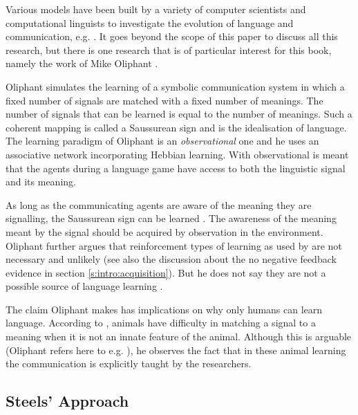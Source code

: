 

Various models have been built by a variety of computer scientists and computational linguists to investigate the evolution of language and communication, e.g. \citep{cangelosiparisi:1998,kirby:1997,maclennan:1991,oliphant:1997,wernerdyer:1991}. It goes beyond the scope of this paper to discuss all this research, but there is one research that is of particular interest for this book, namely the work of Mike Oliphant \citep{oliphant:1997,oliphant:1998,oliphant:2000}.

Oliphant simulates the learning of a symbolic communication system in which a fixed number of signals are matched with a fixed number of meanings. The number of signals that can be learned is equal to the number of meanings. Such a coherent mapping is called a Saussurean sign \citep{saussure:1974} and is the idealisation of language. The learning paradigm of Oliphant is an {\em observational} one and he uses an associative network incorporating Hebbian learning. With observational is meant that the agents during a language game have access to both the linguistic signal and its meaning.

As long as the communicating agents are aware of the meaning they are signalling, the Saussurean sign can be learned \citep{oliphant:1997,oliphant:2000}. The awareness of the meaning meant by the signal should be acquired by observation in the environment. Oliphant further argues that reinforcement types of learning as used by \citep{yancostein,steels:1996a} are not necessary and unlikely (see also the discussion about the no negative feedback evidence in section \ref{s:intro:acquisition}). But he does not say they are not a possible source of language learning \citep{oliphant:2000}.

The claim Oliphant makes has implications on why only humans can learn language. According to \citet{oliphant:1998}, animals have difficulty in matching a signal to a meaning when it is not an innate feature of the animal. Although this is arguable (Oliphant refers here to e.g. \citep{gardners:1969,premack:1971}), he observes the fact that in these animal learning the communication is explicitly taught by the researchers.


\subsection{Steels' Approach}\label{s:intro:th}


